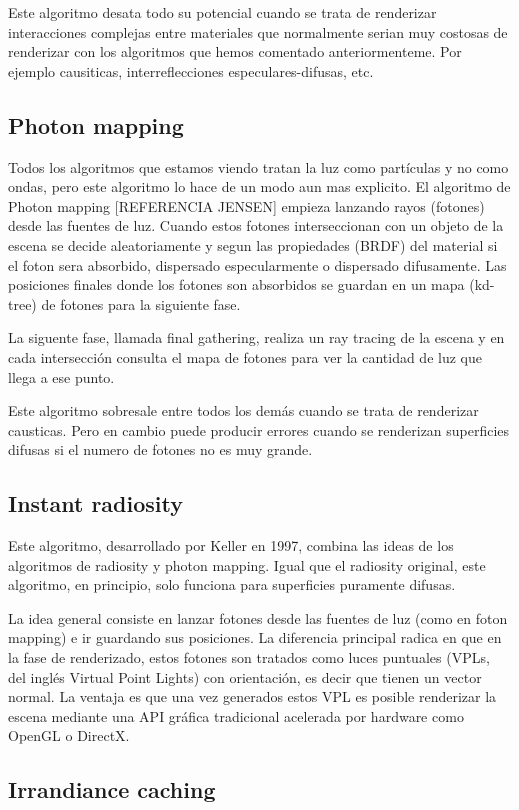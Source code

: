 \medskip
Este algoritmo desata todo su potencial cuando se trata de renderizar interacciones complejas entre materiales que normalmente serian muy costosas de renderizar con los algoritmos que hemos comentado anteriormenteme. Por ejemplo causiticas, interreflecciones especulares-difusas, etc.

\clearpage

\subsection{Photon mapping}

Todos los algoritmos que estamos viendo tratan la luz como partículas y no como ondas, pero este algoritmo lo hace de un modo aun mas explicito.
El algoritmo de Photon mapping [REFERENCIA JENSEN] empieza lanzando rayos (fotones) desde las fuentes de luz. Cuando estos fotones interseccionan con un objeto de la escena se decide aleatoriamente y segun las propiedades (BRDF) del material si el foton sera absorbido, dispersado especularmente o dispersado difusamente. Las posiciones finales donde los fotones son absorbidos se guardan en un mapa (kd-tree) de fotones para la siguiente fase.

\medskip
La siguente fase, llamada final gathering, realiza un ray tracing de la escena y en cada intersección consulta el mapa de fotones para ver la cantidad de luz que llega a ese punto.

\medskip
Este algoritmo sobresale entre todos los demás cuando se trata de renderizar causticas. Pero en cambio puede producir errores cuando se renderizan superficies difusas si el numero de fotones no es muy grande.


\subsection{Instant radiosity}

Este algoritmo, desarrollado por Keller en 1997, combina las ideas de los algoritmos de radiosity y photon mapping. Igual que el radiosity original, este algoritmo, en principio, solo funciona para superficies puramente difusas.

\medskip
La idea general consiste en lanzar fotones desde las fuentes de luz (como en foton mapping) e ir guardando sus posiciones. La diferencia principal radica en que en la fase de renderizado, estos fotones son tratados como luces puntuales (VPLs, del inglés Virtual Point Lights) con orientación, es decir que tienen un vector normal. La ventaja es que una vez generados estos VPL es posible renderizar la escena mediante una API gráfica tradicional acelerada por hardware como OpenGL o DirectX. 

\subsection{Irrandiance caching}

